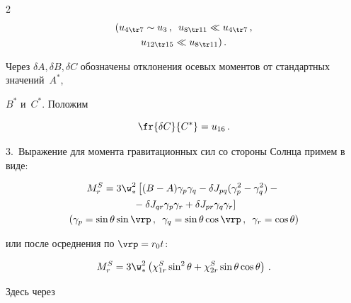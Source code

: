 \begin{multicols}{2}
\begin{gather*}


(u_{4\tr 7} \sim u_3\,,\enskip u_{8\tr 11} \ll u_{4\tr 7}\,,\\


u_{12\tr 15} \ll u_{8\tr 11})\,.


\end{gather*}





Через $\delta A, \delta B, \delta C$ обозначены отклонения осевых моментов от стандартных значений~$A^*$, 


$B^*$ и~$C^*$. Положим


    $$


    \fr{\delta C}{ C^*} = u_{16}\,.


    $$





\smallskip





3.\ Выражение для момента гравитационных сил со стороны Солнца примем в виде:


    \begin{multline}


    M^S_r = 3 \w_*^2 \left[ (B-A) \gamma_p \gamma_q - \delta J_{pq} 


    (\gamma_p^2- \gamma_q^2) -{}\right.\\


\left.    {}-\delta J_{qr} \gamma_p\gamma_r +\delta J_{pr} \gamma_q \gamma_r\right] \\


(\gamma_p =\sin \theta \sin\vrp\,,\enskip \gamma_q = \sin \theta \cos\vrp\,,\enskip 


    \gamma_r =\cos \theta)


        \label{e4-mar}


    \end{multline}


или после осреднения по $\vrp = r_0 t$:


\begin{equation}


M_r^S = 3\w_*^2 \left(\chi_{1r}^S \sin^2\theta +\chi_{2r}^S \sin\theta \cos\theta\right)\,.


\label{e5-mar}


\end{equation}


Здесь через



\end{multicols}
